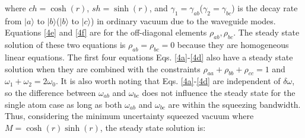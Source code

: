 \documentclass[aps,showpacs,twocolumn,twoside,groupedaddress]{revtex4}
\begin{document}
where $ch=\cosh(r)$, $sh=\sinh(r)$, and $\gamma_{1}=\gamma_{ab}$($\gamma_{2}=\gamma_{bc}$) is the decay rate from $|a\rangle$ to $|b\rangle$($|b\rangle$ to $|c\rangle$) in ordinary vacuum due to the waveguide modes. Equations \eqref{4e} and \eqref{4f} are for the off-diagonal elements $\rho_{ab}, \rho_{bc}$. The steady state solution of these two equations is $\rho_{ab}=\rho_{bc}=0$ because they are homogeneous linear equations. The first four equations Eqs.  \eqref{4a}-\eqref{4d} also have a steady state solution when they are combined with the constraints $\rho_{aa}+\rho_{bb}+\rho_{cc}=1$ and $\omega_1+\omega_2=2\omega_0$. It is also worth noting that Eqs. \eqref{4a}-\eqref{4d} are independent of $\delta\omega$, so the difference between $\omega_{ab}$ and $\omega_{bc}$ does not influence the steady state for the single atom case as long as both $\omega_{ab}$ and $\omega_{bc}$ are within the squeezing bandwidth. Thus, considering the minimum uncertainty squeezed vacuum where $M=\cosh(r)\sinh(r)$, the steady state solution is:
\end{document}
